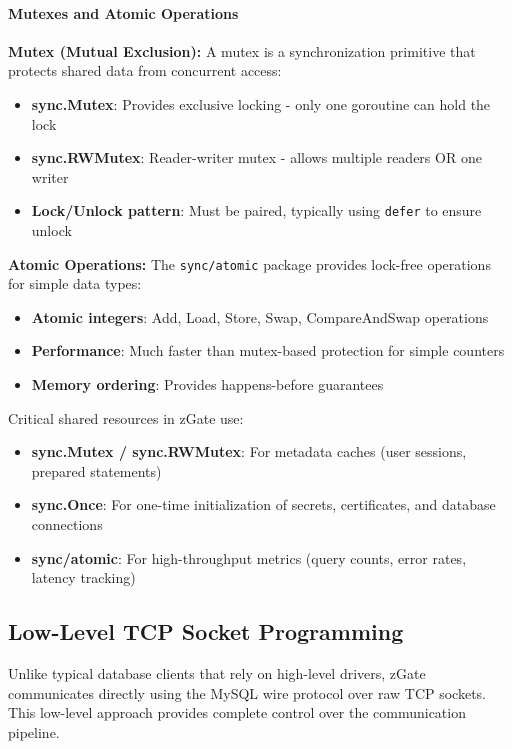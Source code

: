 \paragraph{Mutexes and Atomic Operations}

\textbf{Mutex (Mutual Exclusion):}
A mutex is a synchronization primitive that protects shared data from concurrent access:

\begin{itemize}
    \item \textbf{sync.Mutex}: Provides exclusive locking - only one goroutine can hold the lock
    \item \textbf{sync.RWMutex}: Reader-writer mutex - allows multiple readers OR one writer
    \item \textbf{Lock/Unlock pattern}: Must be paired, typically using \texttt{defer} to ensure unlock
\end{itemize}

\textbf{Atomic Operations:}
The \texttt{sync/atomic} package provides lock-free operations for simple data types:

\begin{itemize}
    \item \textbf{Atomic integers}: Add, Load, Store, Swap, CompareAndSwap operations
    \item \textbf{Performance}: Much faster than mutex-based protection for simple counters
    \item \textbf{Memory ordering}: Provides happens-before guarantees
\end{itemize}

Critical shared resources in zGate use:
\begin{itemize}
    \item \textbf{sync.Mutex / sync.RWMutex}: For metadata caches (user sessions, prepared statements)
    \item \textbf{sync.Once}: For one-time initialization of secrets, certificates, and database connections
    \item \textbf{sync/atomic}: For high-throughput metrics (query counts, error rates, latency tracking)
\end{itemize}

\subsection{Low-Level TCP Socket Programming}

Unlike typical database clients that rely on high-level drivers, zGate communicates directly using the MySQL wire protocol over raw TCP sockets. This low-level approach provides complete control over the communication pipeline.

